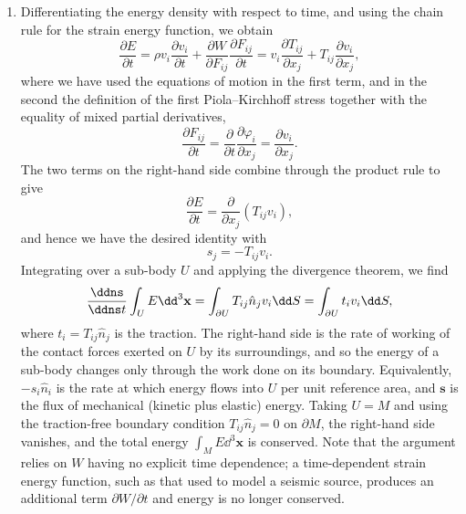 \documentclass[a4paper,10pt]{paper}
\begin{document}
\begin{enumerate}
\begin{enumerate}
and as $\mathbf{F}$ is invertible, $\mathbf{S}^{T}=\mathbf{S}$.
\end{enumerate}
\item Differentiating the energy density with respect to time, and using the chain rule for the strain energy function, we obtain
\begin{equation*}
    \frac{\partial E}{\partial t}=\rho v_{i}\frac{\partial v_{i}}{\partial t}+\frac{\partial W}{\partial F_{ij}}\frac{\partial F_{ij}}{\partial t}=v_{i}\frac{\partial T_{ij}}{\partial x_{j}}+T_{ij}\frac{\partial v_{i}}{\partial x_{j}},
\end{equation*}
where we have used the equations of motion in the first term, and in the second the definition of the first Piola--Kirchhoff stress together with the equality of mixed partial derivatives,
\begin{equation*}
    \frac{\partial F_{ij}}{\partial t}=\frac{\partial}{\partial t}\frac{\partial\varphi_{i}}{\partial x_{j}}=\frac{\partial v_{i}}{\partial x_{j}}.
\end{equation*}
The two terms on the right-hand side combine through the product rule to give
\begin{equation*}
    \frac{\partial E}{\partial t}=\frac{\partial}{\partial x_{j}}(T_{ij}v_{i}),
\end{equation*}
and hence we have the desired identity with
\begin{equation*}
    s_{j}=-T_{ij}v_{i}.
\end{equation*}
Integrating over a sub-body $U$ and applying the divergence theorem, we find
\begin{equation*}
    \frac{\ddns}{\ddns t}\int_{U}E\dd^{3}\mathbf{x}=\int_{\partial U}T_{ij}\hat{n}_{j}v_{i}\dd S=\int_{\partial U}t_{i}v_{i}\dd S,
\end{equation*}
where $t_{i}=T_{ij}\hat{n}_{j}$ is the traction. The right-hand side is the rate of working of the contact forces exerted on $U$ by its surroundings, and so the energy of a sub-body changes only through the work done on its boundary. Equivalently, $-s_{i}\hat{n}_{i}$ is the rate at which energy flows into $U$ per unit reference area, and $\mathbf{s}$ is the flux of mechanical (kinetic plus elastic) energy. Taking $U=M$ and using the traction-free boundary condition $T_{ij}\hat{n}_{j}=0$ on $\partial M$, the right-hand side vanishes, and the total energy $\int_{M}E\dd^{3}\mathbf{x}$ is conserved. Note that the argument relies on $W$ having no explicit time dependence; a time-dependent strain energy function, such as that used to model a seismic source, produces an additional term $\partial W/\partial t$ and energy is no longer conserved.


\end{enumerate}
\end{document}
